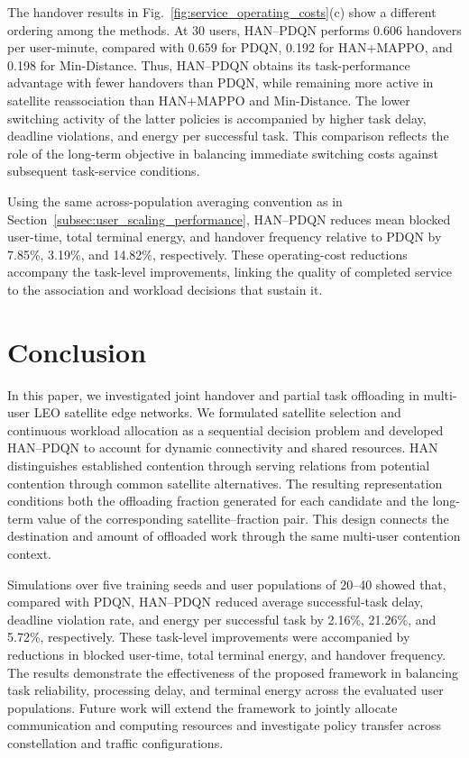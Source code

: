 \documentclass[journal]{IEEEtran}
\begin{document}
The handover results in
Fig.~\ref{fig:service_operating_costs}(c) show a
different ordering among the methods.
At 30 users, HAN--PDQN performs 0.606 handovers per
user-minute, compared with 0.659 for PDQN,
0.192 for HAN+MAPPO, and 0.198 for Min-Distance.
Thus, HAN--PDQN obtains its task-performance advantage
with fewer handovers than PDQN, while remaining more
active in satellite reassociation than HAN+MAPPO
and Min-Distance.
The lower switching activity of the latter policies
is accompanied by higher task delay, deadline violations,
and energy per successful task.
This comparison reflects the role of the long-term
objective in balancing immediate switching costs
against subsequent task-service conditions.

Using the same across-population averaging convention
as in Section~\ref{subsec:user_scaling_performance},
HAN--PDQN reduces mean blocked user-time,
total terminal energy, and handover frequency relative
to PDQN by 7.85\%, 3.19\%, and 14.82\%, respectively.
These operating-cost reductions accompany the
task-level improvements, linking the quality of
completed service to the association and workload
decisions that sustain it.

\FloatBarrier

\section{Conclusion}
\label{sec:conclusion}

In this paper, we investigated joint handover and partial
task offloading in multi-user LEO satellite edge networks.
We formulated satellite selection and continuous workload
allocation as a sequential decision problem and developed
HAN--PDQN to account for dynamic connectivity and shared
resources. HAN distinguishes established contention through
serving relations from potential contention through common
satellite alternatives. The resulting representation conditions
both the offloading fraction generated for each candidate
and the long-term value of the corresponding satellite--fraction
pair. This design connects the destination and amount of
offloaded work through the same multi-user contention context.

Simulations over five training seeds and user populations
of 20--40 showed that, compared with PDQN, HAN--PDQN
reduced average successful-task delay, deadline violation
rate, and energy per successful task by 2.16\%, 21.26\%,
and 5.72\%, respectively. These task-level improvements
were accompanied by reductions in blocked user-time,
total terminal energy, and handover frequency. The results
demonstrate the effectiveness of the proposed framework
in balancing task reliability, processing delay, and terminal
energy across the evaluated user populations. Future work
will extend the framework to jointly allocate communication
and computing resources and investigate policy transfer
across constellation and traffic configurations.



\end{document}
